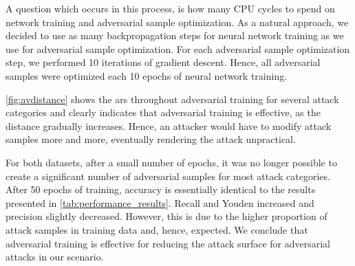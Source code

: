 \documentclass[conference]{IEEEtran}
\newcommand\note[2]{{\color{#1}#2}}
\newcommand\todo[1]{{\note{red}{TODO: #1}}}
\begin{document}
A question which occurs in this process, is how many CPU cycles to spend on network training and adversarial sample optimization. As a natural approach, we decided to use as many backpropagation steps for neural network training as we use for adversarial sample optimization.  For each adversarial sample optimization step, we performed 10 iterations of gradient descent. Hence, all adversarial samples were optimized each 10 epochs of neural network training.

\autoref{fig:avdistance} shows the \gls{ars} throughout  adversarial training  for several attack categories and clearly indicates that adversarial training is effective, as the distance gradually increases. Hence, an attacker would have to modify attack samples more and more, eventually rendering the attack unpractical.





For both datasets, after a small number of epochs, it was no longer possible to create a significant number of adversarial samples for most attack categories. %
After 50 epochs of training, accuracy is essentially identical to the results presented in \autoref{tab:performance_results}. Recall and Youden increased and precision slightly decreased. However, this is due to the higher proportion of attack samples in training data and, hence, expected.
We conclude that adversarial training is effective for reducing the attack surface for adversarial attacks in our scenario.


\end{document}
